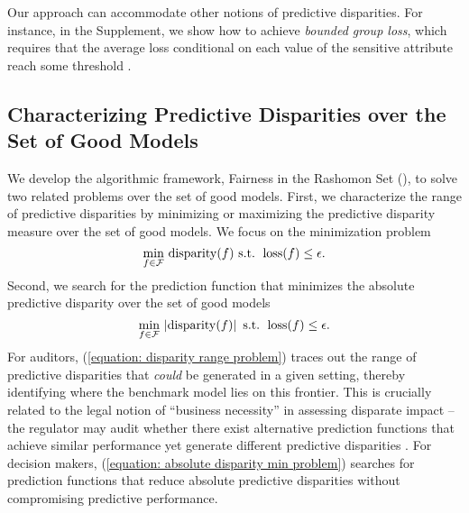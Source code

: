\documentclass{article}
\begin{document}
Our approach can accommodate other notions of predictive disparities. For instance, in the Supplement, we show how to achieve \textit{bounded group loss}, which requires that the average loss conditional on each value of the sensitive attribute reach some threshold \cite{AgarwalEtAl(19)-FairRegression}. 

\subsection{Characterizing Predictive Disparities over the Set of Good Models}
We develop the algorithmic framework, Fairness in the Rashomon Set (\fairs), to solve two related problems over the set of good models. First, we characterize the range of predictive disparities by minimizing or maximizing the predictive disparity measure over the set of good models. We focus on the minimization problem 
    \begin{equation}\label{equation: disparity range problem}
        \min_{f \in \mathcal{F}} \, \operatorname{disparity}(f) \mbox{ s.t. } \operatorname{loss}(f) \leq \epsilon.
    \end{equation}
Second, we search for the prediction function that minimizes the absolute predictive disparity over the set of good models
    \begin{equation}\label{equation: absolute disparity min problem}
        \min_{f \in \mathcal{F}} \, \left| \operatorname{disparity}(f) \right| \mbox{ s.t. } \operatorname{loss}(f) \leq \epsilon. 
    \end{equation}
For auditors, (\ref{equation: disparity range problem}) traces out the range of predictive disparities that \textit{could} be generated in a given setting, thereby identifying where the benchmark model lies on this frontier. This is crucially related to the legal notion of ``business necessity'' in assessing disparate impact -- the regulator may audit whether there exist alternative prediction functions that achieve similar performance yet generate different predictive disparities \cite{civil-rights-act, ECOA, BarocasSelbst2016}. For decision makers, (\ref{equation: absolute disparity min problem}) searches for prediction functions that reduce absolute predictive disparities without compromising predictive performance. 
\end{document}
